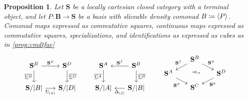 \documentclass[11pt, oneside, article]{memoir}
\theoremstyle{plain}
\newtheorem{proposition}[theorem]{Proposition}
\theoremstyle{definition}
\theoremstyle{remark}
\DeclarePairedDelimiter{\gen}{\langle}{\rangle}
\DeclarePairedDelimiter{\abs}{\lvert}{\rvert}
\newcommand{\cat}[1]{\mathbf{#1}}
\newcommand{\CoalgOn}[2]{{#2}^{#1}}
\newcommand{\CoalgS}[1]{\CoalgOn{#1}{\bS}}
\newcommand{\pts}[1]{{\abs{#1}}}
\newcommand{\one}[1]{\pts{#1}}
\newcommand{\ptlift}[1]{\overline{#1}}
\newcommand{\carr}{\Sigma}
\newcommand{\leindex}[1]{\Sigma_{#1}}
\newcommand{\reindex}[1]{\Delta_{#1}}
\newcommand{\car}[1]{\carr^{#1}}
\newcommand{\carA}{\car{\cA}}
\newcommand{\carB}{\car{\cB}}
\newcommand{\carD}{\car{\cD}}
\newcommand{\ph}[1]{#1}
\newcommand{\com}[2]{{#1}^{#2}}
\newcommand{\con}[2]{{#1}^{#2}}
\newcommand{\cmnd}[1]{{#1}}
\newcommand{\cA}{\cmnd{A}}
\newcommand{\cB}{\cmnd{B}}
\newcommand{\cC}{\cmnd{C}}
\newcommand{\cD}{\cmnd{D}}
\newcommand{\bB}{\cat{B}}
\newcommand{\bS}{\cat{S}}
\newcommand{\pP}{\ph{P}}
\newcommand{\cP}{\gen{\pP}}
\newcommand{\AS}{\CoalgS{\cA}}
\newcommand{\BS}{\CoalgS{\cB}}
\newcommand{\CS}{\CoalgS{\cC}}
\newcommand{\DS}{\CoalgS{\cD}}
\newcommand{\SA}{\bS/\pts{\cA}}
\newcommand{\SB}{\bS/\pts{\cB}}
\newcommand{\SD}{\bS/\pts{\cD}}
\begin{document}
\begin{proposition}\label{prop:lccbasis}
  Let $\bS$ be a locally cartesian closed category with a terminal
  object, and let $\pP \colon \bB \to \bS$ be a basis with sliceable
  density comonad $\cB \coloneqq \cP$. Comonad maps expressed as
  commutative squares, continuous maps expressed as commutative
  squares, specializations, and identifications as expressed as cubes
  as in \cref{prop:cmdtfae}
  \[
    \begin{tikzcd}[column sep=15]
      \BS & \DS \\
      {\SB} & {\SD}
      \arrow["{\com{\bS}{\psi}}", from=1-1, to=1-2]
      \arrow["{\ptlift{\carB}}"', from=1-1, to=2-1]
      \arrow["{\ptlift{\carD}}", from=1-2, to=2-2]
      \arrow["{\leindex{\one{\psi}}}"', from=2-1, to=2-2]
    \end{tikzcd}
    \qquad
    \begin{tikzcd}[column sep=15]
      \AS & \BS \\
      {\SA} & {\SB}
      \arrow["\ptlift{\carA}"', from=1-1, to=2-1]
      \arrow["{\con{\bS}{f}}"', from=1-2, to=1-1]
      \arrow["\ptlift{\carB}", from=1-2, to=2-2]
      \arrow["{\reindex{\one{f}}}", from=2-2, to=2-1]
    \end{tikzcd}
    \qquad
    \begin{tikzcd}[column sep=17, row sep=5]
      & \BS & \\
      \AS && \DS \\
      & \CS & \\
      \arrow["{\con{\bS}{f}}"'{pos=0.35}, from=1-2, to=2-1]
      \arrow["{\Rightarrow_\sigma}"{description}, shift left, draw=none, from=1-2, to=3-2]
      \arrow["{\com{\bS}{\psi}}"{pos=0.35}, from=1-2, to=2-3]
      \arrow["{\con{\bS}{g}}", from=2-3, to=3-2]
      \arrow["{\com{\bS}{\phi}}"', from=2-1, to=3-2]
    \end{tikzcd}
\]
\end{proposition}
\end{document}
